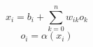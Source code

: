 \documentclass[../SOP.tex]{subfile}
\begin{document}
\begin{equation}
  x_i=b_i+\sum_{k=0}^{n} w_{ik}o_k
  \label{eq:inputvalue}
\end{equation}
\begin{equation}
  o_i=\alpha(x_i)
  \label{eq:outputvalue}
\end{equation}
\end{document}
